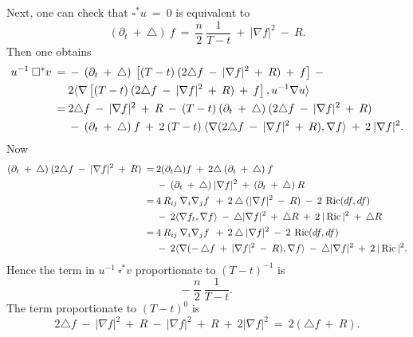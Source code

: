 Next, one can check that $\square^* u \: = \: 0$ is equivalent to
\begin{equation}
(\partial_t \: + \: \triangle) \: f \: = \: \frac{n}{2} \: \frac{1}{T-t}
\: + \: |\nabla f|^2 \: - \: R.
\end{equation}
Then one obtains
\begin{align}
u^{-1} \: \square^* v \: = \: &
- \: (\partial_t \: + \: \triangle) \: \left[ (T - t) \:
(2 \triangle f \: - \: |\nabla f|^2 \: + \: R) \: + \: f \right]
\: - \\
& 2 \langle \nabla \left[ (T - t) \:
(2 \triangle f \: - \: |\nabla f|^2 \: + \: R) \: + \: f \right],
u^{-1} \nabla u \rangle \notag \\
\: = \: & 2 \triangle f \: - \: |\nabla f|^2 \: + \: R \: - \:
(T-t) \: (\partial_t \: + \: \triangle) \:
(2 \triangle f \: - \: |\nabla f|^2 \: + \: R) \notag \\
&- \:
(\partial_t \: + \: \triangle) \: f  \: + \:
2 \: (T-t) \: \langle \nabla
(2 \triangle f \: - \: |\nabla f|^2 \: + \: R),
\nabla f \rangle \: + \: 2 \: |\nabla f|^2. \notag
\end{align}
Now
\begin{align}
(\partial_t \: + \: \triangle) \:
(2 \triangle f \: - \: |\nabla f|^2 \: + \: R) \: = \:
& 2 (\partial_t \triangle) f \: + \: 2 \triangle \:
(\partial_t \: + \: \triangle) \: f \\
& - \: (\partial_t \: + \: \triangle) \: |\nabla f|^2 \: + \:
(\partial_t \: + \: \triangle) \: R \notag \\
 \: = \: & 4 \: R_{ij} \: \nabla_i \nabla_j f \: \: + \:
2 \: \triangle \: (|\nabla f|^2 \: - \: R) \: - \: 2 \:
\operatorname{Ric}(df, df) \notag \\
& - \: 2 \langle \nabla f_t, \nabla f \rangle \: - \:
\triangle |\nabla f|^2
\: + \: \triangle R \: + \: 2 \: |\operatorname{Ric}|^2 \: + \: \triangle R \notag \\
 \: = \: & 4 \: R_{ij} \: \nabla_i \nabla_j f \: \: + \:
2 \: \triangle \: |\nabla f|^2 \: - \: 2 \:
\operatorname{Ric}(df, df) \notag \\
& - \: 2 \langle \nabla
(- \: \triangle f \: + \: |\nabla f|^2 \: - \: R),
\nabla f \rangle \: - \:
\triangle |\nabla f|^2  \: + \: 2 \: |\operatorname{Ric}|^2. \notag
\end{align}
Hence the term in $u^{-1} \: \square^* v$ proportionate to
$(T-t)^{-1}$ is
\begin{equation}
- \: \frac{n}{2} \: \frac{1}{T-t}.
\end{equation}
The term proportionate to $(T-t)^0$ is
\begin{equation}
2 \triangle f \: - \: |\nabla f|^2 \: + \: R \: - \: |\nabla f|^2
\: + \: R \: + \: 2 |\nabla f|^2 \: = \: 2 (\triangle f \: + \: R).
\end{equation}
